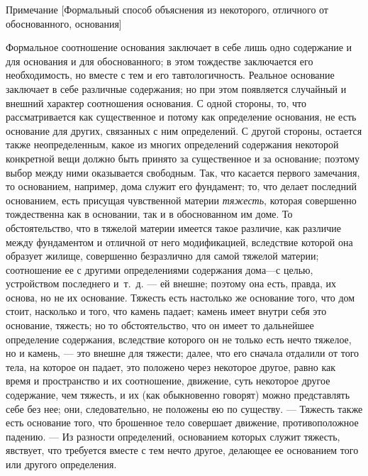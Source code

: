 {\centering
Примечание
[Формальный способ объяснения из некоторого, отличного от обоснованного,
основания]
\par}

Формальное соотношение основания заключает в себе лишь одно содержание и для
основания и для обоснованного; в этом тождестве заключается его
необходимость, но вместе с тем и его тавтологичность. Реальное основание
заключает в себе различные содержания; но при этом появляется случайный и
внешний характер соотношения основания. С одной стороны, то, что
рассматривается как существенное и потому как определение основания, не
есть основание для других, связанных с ним определений. С другой стороны,
остается также неопределенным, какое из многих определений содержания
некоторой конкретной вещи должно быть принято за существенное и за
основание; поэтому выбор между ними оказывается свободным. Так, что
касается первого замечания, то основанием, например, дома служит его
фундамент; то, что делает последний основанием, есть присущая чувственной
материи {\em тяжесть}, которая совершенно тождественна
как в основании, так и в обоснованном им доме. То обстоятельство, что в
тяжелой материи имеется такое различие, как различие между фундаментом и
отличной от него модификацией, вследствие которой она образует жилище,
совершенно безразлично для самой тяжелой материи; соотношение ее с другими
определениями содержания дома—с целью, устройством последнего и~т.~д. — ей
внешне; поэтому она есть, правда, их основа, но не их основание. Тяжесть
есть настолько же основание того, что дом стоит, насколько и того, что
камень падает; камень имеет внутри себя это основание, тяжесть; но то
обстоятельство, что он имеет то дальнейшее определение содержания,
вследствие которого он не только есть нечто тяжелое, но и камень, — это
внешне для тяжести; далее, что его сначала отдалили от того тела, на
которое он падает, это положено через некоторое другое, равно как время и
пространство и их соотношение, движение, суть некоторое другое содержание,
чем тяжесть, и их (как обыкновенно говорят) можно представлять себе без
нее; они, следовательно, не положены ею по существу. — Тяжесть также есть
основание того, что брошенное тело совершает движение, противоположное
падению. — Из разности определений, основанием которых служит тяжесть,
явствует, что требуется вместе с тем нечто другое, делающее ее основанием
того или другого определения.

